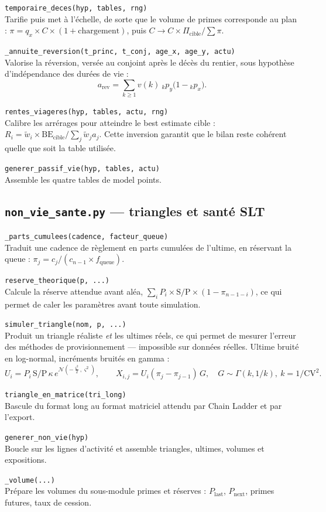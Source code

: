 \documentclass[10pt,a4paper]{article}
\newcommand{\fn}[2]{\par\smallskip\textcolor{bleufonce}{\texttt{#1}}\\ #2\par}
\begin{document}
\fn{temporaire\_deces(hyp, tables, rng)}{Tarifie puis met à l'échelle, de sorte que le volume de
primes corresponde au plan : $\pi = q_x \times C \times (1+\text{chargement})$, puis
$C \rightarrow C \times \Pi_{\text{cible}} / \sum \pi$.}

\fn{\_annuite\_reversion(t\_princ, t\_conj, age\_x, age\_y, actu)}{Valorise la réversion, versée
au conjoint après le décès du rentier, sous hypothèse d'indépendance des durées de vie :
\[
a_{\text{rev}} = \sum_{k\ge1} v(k)\ {}_k p_y \bigl(1 - {}_k p_x\bigr).
\]}

\fn{rentes\_viageres(hyp, tables, actu, rng)}{Calibre les arrérages pour atteindre le best
estimate cible : $R_i = \tilde w_i \times \mathrm{BE}_{\text{cible}} / \sum_j \tilde w_j a_j$.
Cette inversion garantit que le bilan reste cohérent quelle que soit la table utilisée.}

\fn{generer\_passif\_vie(hyp, tables, actu)}{Assemble les quatre tables de model points.}

\subsection{\texttt{non\_vie\_sante.py} — triangles et santé SLT}

\fn{\_parts\_cumulees(cadence, facteur\_queue)}{Traduit une cadence de règlement en parts
cumulées de l'ultime, en réservant la queue :
$\pi_j = c_j / (c_{n-1} \times f_{\text{queue}})$.}

\fn{reserve\_theorique(p, ...)}{Calcule la réserve attendue avant aléa,
$\sum_i P_i \times \mathrm{S/P} \times (1 - \pi_{n-1-i})$, ce qui permet de caler les paramètres
avant toute simulation.}

\fn{simuler\_triangle(nom, p, ...)}{Produit un triangle réaliste \emph{et} les ultimes réels, ce
qui permet de mesurer l'erreur des méthodes de provisionnement — impossible sur données réelles.
Ultime bruité en log-normal, incréments bruités en gamma :
\[
U_i = P_i\,\mathrm{S/P}\,\kappa\,e^{\mathcal{N}(-\frac{\varsigma^2}{2}, \varsigma^2)},
\qquad
X_{i,j} = U_i (\pi_j - \pi_{j-1})\, G, \quad G \sim \Gamma(k, 1/k),\ k = 1/\mathrm{CV}^2.
\]}

\fn{triangle\_en\_matrice(tri\_long)}{Bascule du format long au format matriciel attendu par
Chain Ladder et par l'export.}

\fn{generer\_non\_vie(hyp)}{Boucle sur les lignes d'activité et assemble triangles, ultimes,
volumes et expositions.}

\fn{\_volume(...)}{Prépare les volumes du sous-module primes et réserves : $P_{\text{last}}$,
$P_{\text{next}}$, primes futures, taux de cession.}
\end{document}
